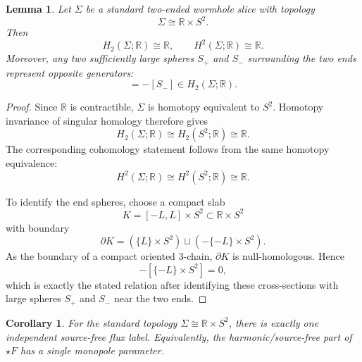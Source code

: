 \documentclass[aps,prd,onecolumn,nofootinbib,superscriptaddress]{revtex4-2}
\newtheorem{lemma}{Lemma}
\newtheorem{corollary}{Corollary}
\begin{document}
\begin{lemma}
\label{lem:standard-topology}
Let $\Sigma$ be a standard two-ended wormhole slice with topology
\begin{equation}
\Sigma \cong \mathbb{R}\times S^2.
\end{equation}
Then
\begin{equation}
H_2(\Sigma;\mathbb{R})\cong \mathbb{R},
\qquad
H^2(\Sigma;\mathbb{R})\cong \mathbb{R}.
\end{equation}
Moreover, any two sufficiently large spheres $S_+$ and $S_-$ surrounding the two ends represent opposite generators:
\begin{equation}
[S_+] = -[S_-] \in H_2(\Sigma;\mathbb{R}).
\end{equation}
\end{lemma}

\begin{proof}
Since $\mathbb{R}$ is contractible, $\Sigma$ is homotopy equivalent to $S^2$. Homotopy invariance of singular homology therefore gives
\begin{equation}
H_2(\Sigma;\mathbb{R})\cong H_2(S^2;\mathbb{R})\cong \mathbb{R}.
\end{equation}
The corresponding cohomology statement follows from the same homotopy equivalence:
\begin{equation}
H^2(\Sigma;\mathbb{R})\cong H^2(S^2;\mathbb{R})\cong \mathbb{R}.
\end{equation}

To identify the end spheres, choose a compact slab
\begin{equation}
K=[-L,L]\times S^2 \subset \mathbb{R}\times S^2
\end{equation}
with boundary
\begin{equation}
\partial K = (\{L\}\times S^2)\sqcup (-\{-L\}\times S^2).
\end{equation}
As the boundary of a compact oriented 3-chain, $\partial K$ is null-homologous. Hence
\begin{equation}
[\{L\}\times S^2]-[\{-L\}\times S^2]=0,
\end{equation}
which is exactly the stated relation after identifying these cross-sections with large spheres $S_+$ and $S_-$ near the two ends.
\end{proof}

\begin{corollary}
\label{cor:one-flux-label}
For the standard topology $\Sigma\cong\mathbb{R}\times S^2$, there is exactly one independent source-free flux label. Equivalently, the harmonic/source-free part of $\star F$ has a single monopole parameter.
\end{corollary}
\end{document}
